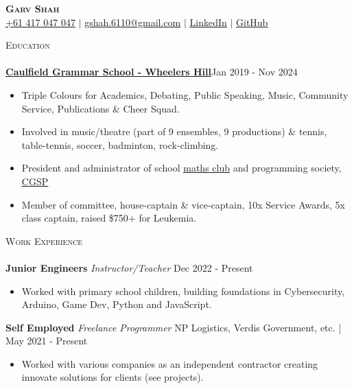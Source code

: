 \documentclass[a4paper]{article}
\newcommand{\lineunder} {
    \vspace*{-8pt} \\
    \hspace*{-10pt} \hrulefill \\
}
\newcommand{\header} [1] {
    {\hspace*{-10pt}\vspace*{6pt} \textsc{#1}}
    \vspace*{-6pt} \lineunder
}
\begin{document}

\begin{center}
    \textbf{\Huge \scshape Garv Shah} \\ \vspace{1pt}
    \small \href{tel:+61417047047}{+61 417 047 047} $|$ \href{mailto:gshah.6110@gmail.com}{gshah.6110@gmail.com} $|$
    \href{https://www.linkedin.com/in/garvshah/}{\ul{LinkedIn}} $|$
    \href{https://garv-shah.github.io/}{\ul{GitHub}}
\end{center}
\vspace{-2mm}

\header{Education}
\href{https://www.caulfieldgs.vic.edu.au/wheelers-hill/}{\textbf{\ul{Caulfield Grammar School - Wheelers Hill}}}\hfill Jan 2019 - Nov 2024\\
\vspace{-2mm}
\begin{itemize} \itemsep 1pt
	\item Triple Colours for Academics, Debating, Public Speaking, Music, Community Service, Publications \& Cheer Squad.
        \item Involved in music/theatre (part of 9 ensembles, 9 productions) \& tennis, table-tennis, soccer, badminton, rock-climbing.
        \item President and administrator of school \href{https://cgs-math.github.io/}{\ul{maths club}} and programming society, \href{https://cgs-programming.github.io}{\ul{CGSP}}
        \item Member of committee, house-captain \& vice-captain, 10x Service Awards, 5x class captain, raised \$750+ for Leukemia.
\end{itemize}
\vspace{-2mm}

\header{Work Experience}

\textbf{Junior Engineers} \textit{Instructor/Teacher} \hfill Dec 2022 - Present\\
\vspace{-3mm}
\begin{itemize} \itemsep 0.5pt
    \item Worked with primary school children, building foundations in Cybersecurity, Arduino, Game Dev, Python and JavaScript.
\end{itemize}
\vspace{-2mm}

\textbf{Self Employed} \textit{Freelance Programmer} \hfill NP Logistics, Verdis Government, etc. | May 2021 - Present\\
\vspace{-3mm}
\begin{itemize} \itemsep 0.5pt
\item Worked with various companies as an independent contractor creating innovate solutions for clients (see projects).
\end{itemize}
\vspace{-2mm}
\end{document}
